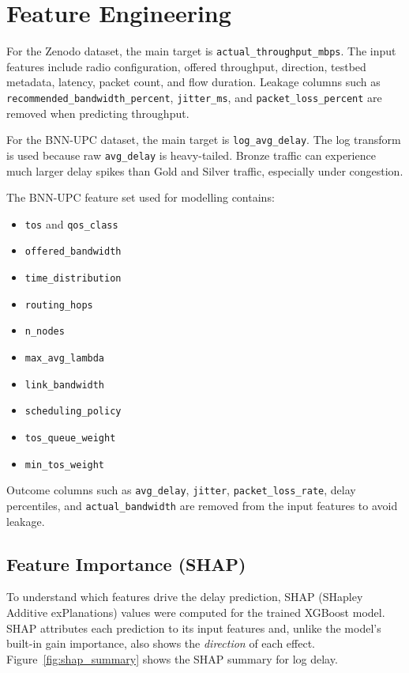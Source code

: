 \documentclass[a4paper,12pt]{Classes/RoboticsLaTeX}
\begin{document}
\section{Feature Engineering}

For the Zenodo dataset, the main target is \texttt{actual\_throughput\_mbps}. The input features include radio configuration, offered throughput, direction, testbed metadata, latency, packet count, and flow duration. Leakage columns such as \texttt{recommended\_bandwidth\_percent}, \texttt{jitter\_ms}, and \texttt{packet\_loss\_percent} are removed when predicting throughput.

For the BNN-UPC dataset, the main target is \texttt{log\_avg\_delay}. The log transform is used because raw \texttt{avg\_delay} is heavy-tailed. Bronze traffic can experience much larger delay spikes than Gold and Silver traffic, especially under congestion.

The BNN-UPC feature set used for modelling contains:

\begin{itemize}
    \item \texttt{tos} and \texttt{qos\_class}
    \item \texttt{offered\_bandwidth}
    \item \texttt{time\_distribution}
    \item \texttt{routing\_hops}
    \item \texttt{n\_nodes}
    \item \texttt{max\_avg\_lambda}
    \item \texttt{link\_bandwidth}
    \item \texttt{scheduling\_policy}
    \item \texttt{tos\_queue\_weight}
    \item \texttt{min\_tos\_weight}
\end{itemize}

Outcome columns such as \texttt{avg\_delay}, \texttt{jitter}, \texttt{packet\_loss\_rate}, delay percentiles, and \texttt{actual\_bandwidth} are removed from the input features to avoid leakage.

\subsection{Feature Importance (SHAP)}

To understand which features drive the delay prediction, SHAP (SHapley Additive exPlanations) values were computed for the trained XGBoost model. SHAP attributes each prediction to its input features and, unlike the model's built-in gain importance, also shows the \emph{direction} of each effect. Figure~\ref{fig:shap_summary} shows the SHAP summary for log delay.
\end{document}
